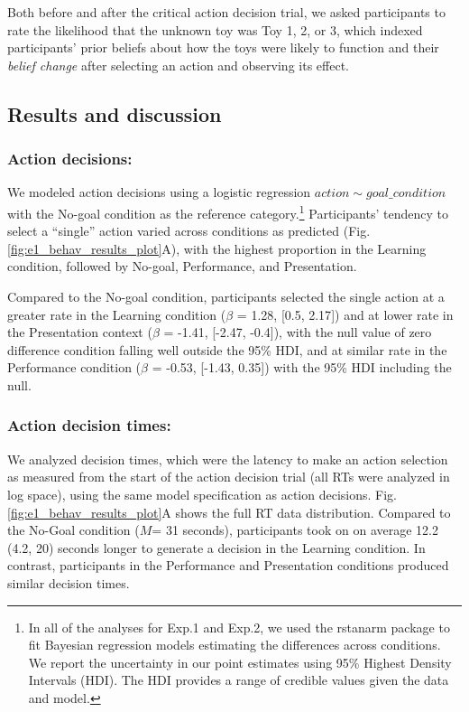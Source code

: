 \documentclass[10pt, letterpaper]{article}
\begin{document}
Both before and after the critical action decision trial, we asked
participants to rate the likelihood that the unknown toy was Toy 1, 2,
or 3, which indexed participants' prior beliefs about how the toys were
likely to function and their \emph{belief change} after selecting an
action and observing its effect.

\subsection{Results and discussion}\label{results-and-discussion}

\subsubsection{Action decisions:}\label{action-decisions}

We modeled action decisions using a logistic regression
\texttt{$action \sim goal\_condition$} with the No-goal condition as the
reference
category.\footnote{In all of the analyses for Exp.1 and Exp.2, we used the {\selectfont rstanarm} package to fit Bayesian regression models estimating the differences across conditions. We report the uncertainty in our point estimates using 95\% Highest Density Intervals (HDI). The HDI provides a range of credible values given the data and model.}
Participants' tendency to select a ``single'' action varied across
conditions as predicted (Fig. \ref{fig:e1_behav_results_plot}A), with
the highest proportion in the Learning condition, followed by No-goal,
Performance, and Presentation.

Compared to the No-goal condition, participants selected the single
action at a greater rate in the Learning condition (\(\beta\) = 1.28,
{[}0.5, 2.17{]}) and at lower rate in the Presentation context
(\(\beta\) = -1.41, {[}-2.47, -0.4{]}), with the null value of zero
difference condition falling well outside the 95\% HDI, and at similar
rate in the Performance condition (\(\beta\) = -0.53, {[}-1.43, 0.35{]})
with the 95\% HDI including the null.

\subsubsection{Action decision times:}\label{action-decision-times}

We analyzed decision times, which were the latency to make an action
selection as measured from the start of the action decision trial (all
RTs were analyzed in log space), using the same model specification as
action decisions. Fig. \ref{fig:e1_behav_results_plot}A shows the full
RT data distribution. Compared to the No-Goal condition (\(M\)= 31
seconds), participants took on on average 12.2 (4.2, 20) seconds longer
to generate a decision in the Learning condition. In contrast,
participants in the Performance and Presentation conditions produced
similar decision times.
\end{document}
